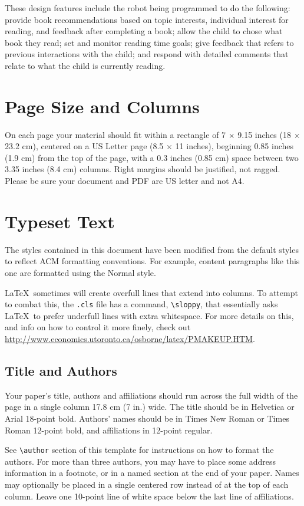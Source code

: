 \documentclass{sigchi}
\begin{document}
These design features include the robot being programmed to do the following: provide book recommendations based on topic interests, individual interest for reading, and feedback after completing a book; allow the child to chose what book they read; set and monitor reading time goals; give feedback that refers to previous interactions with the child; and respond with detailed comments that relate to what the child is currently reading.

\section{Page Size and Columns}
On each page your material should fit within a rectangle of 7 $\times$
9.15 inches (18 $\times$ 23.2 cm), centered on a US Letter page (8.5
$\times$ 11 inches), beginning 0.85 inches (1.9 cm) from the top of
the page, with a 0.3 inches (0.85 cm) space between two 3.35 inches
(8.4 cm) columns. Right margins should be justified, not
ragged. Please be sure your document and PDF are US letter and not A4.

\section{Typeset Text}
The styles contained in this document have been modified from the
default styles to reflect ACM formatting conventions. For example,
content paragraphs like this one are formatted using the Normal style.

\LaTeX\ sometimes will create overfull lines that extend into columns.
To attempt to combat this, the \texttt{.cls} file has a command,
\texttt{{\textbackslash}sloppy}, that essentially asks \LaTeX\ to
prefer underfull lines with extra whitespace.  For more details on
this, and info on how to control it more finely, check out
{\url{http://www.economics.utoronto.ca/osborne/latex/PMAKEUP.HTM}}.

\subsection{Title and Authors}

Your paper's title, authors and affiliations should run across the
full width of the page in a single column 17.8 cm (7 in.) wide.  The
title should be in Helvetica or Arial 18-point bold.  Authors' names
should be in Times New Roman or Times Roman 12-point bold, and
affiliations in 12-point regular.  

See \texttt{{\textbackslash}author} section of this template for
instructions on how to format the authors. For more than three
authors, you may have to place some address information in a footnote,
or in a named section at the end of your paper. Names may optionally
be placed in a single centered row instead of at the top of each
column. Leave one 10-point line of white space below the last line of
affiliations.
\end{document}
